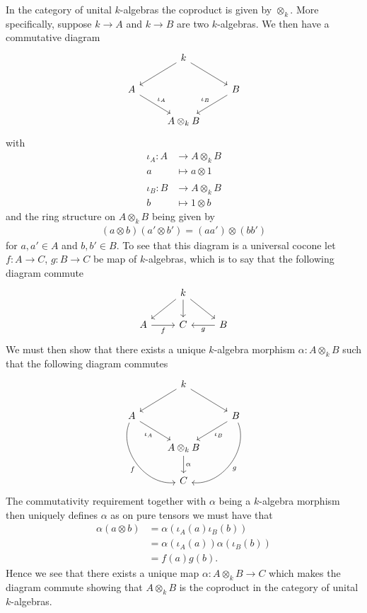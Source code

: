 \documentclass[a4paper]{article}
\begin{document}
\begin{exercise}{3}
In the category of unital $ k $-algebras the coproduct is given by $ \otimes_k $. More specifically, suppose $ k \to A $ and $ k \to B $ are two $ k $-algebras. We then have a commutative diagram
\[\begin{tikzcd}
	& k \\
	A && B \\
	& {A\otimes_k B}
	\arrow["{\iota_A}", from=2-1, to=3-2]
	\arrow["{\iota_B}"', from=2-3, to=3-2]
	\arrow[from=1-2, to=2-1]
	\arrow[from=1-2, to=2-3]
\end{tikzcd}\]
with
\begin{align*}
  \iota_A: A &\to A\otimes_k B \\
  a &\mapsto a\otimes 1 \\
  \\
  \iota_B: B &\to A \otimes_k B \\
  b &\mapsto 1 \otimes b
\end{align*}
and the ring structure on $ A\otimes_k B $ being given by
\begin{align*}
  (a \otimes b)(a' \otimes b') = (aa') \otimes (bb')
\end{align*}
for $ a,a' \in A $ and $ b,b' \in B $. To see that this diagram is a universal cocone let $ f:A \to C $, $ g:B \to C $ be map of $ k $-algebras, which is to say that the following diagram commute
\[\begin{tikzcd}
	& k \\
	A & C & B
	\arrow["f"', from=2-1, to=2-2]
	\arrow[from=1-2, to=2-1]
	\arrow[from=1-2, to=2-2]
	\arrow["g", from=2-3, to=2-2]
	\arrow[from=1-2, to=2-3]
\end{tikzcd}\]
We must then show that there exists a unique $ k $-algebra morphism $ \alpha: A \otimes_k B $ such that the following diagram commutes
\[\begin{tikzcd}
	& k \\
	A && B \\
	& {A \otimes_k B} \\
	& C
	\arrow[from=1-2, to=2-1]
	\arrow[from=1-2, to=2-3]
	\arrow["{\iota_B}", from=2-3, to=3-2]
	\arrow["{\iota_A}"', from=2-1, to=3-2]
	\arrow["g", bend left=60, from=2-3, to=4-2]
	\arrow["f"', bend right=60, from=2-1, to=4-2]
	\arrow["\alpha", from=3-2, to=4-2]
\end{tikzcd}\]
The commutativity requirement together with $ \alpha $ being a $ k $-algebra morphism then uniquely defines $ \alpha $ as on pure tensors we must have that
\begin{align*}
  \alpha(a \otimes b) &= \alpha(\iota_A(a)\iota_B(b)) \\
                      &= \alpha(\iota_A(a))\alpha(\iota_B(b)) \\
                      &= f(a)g(b)
.\end{align*}
Hence we see that there exists a unique map $ \alpha: A \otimes_k B \to C $ which makes the diagram commute showing that $ A \otimes_k B $ is the coproduct in the category of unital $ k $-algebras.


\end{exercise}
\end{document}
